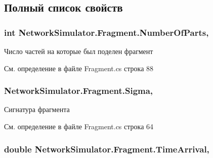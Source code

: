 \subsection{Полный список свойств}
\subsubsection[{\texorpdfstring{Number\+Of\+Parts}{NumberOfParts}}]{\setlength{\rightskip}{0pt plus 5cm}int Network\+Simulator.\+Fragment.\+Number\+Of\+Parts\hspace{0.3cm}{\ttfamily [get]}, {\ttfamily [set]}}\hypertarget{class_network_simulator_1_1_fragment_a2c78012857282ae0729edba332f936ee}{}\label{class_network_simulator_1_1_fragment_a2c78012857282ae0729edba332f936ee}


Число частей на которые был поделен фрагмент 



См. определение в файле Fragment.\+cs строка 88

\subsubsection[{\texorpdfstring{Sigma}{Sigma}}]{ Network\+Simulator.\+Fragment.\+Sigma\hspace{0.3cm}{\ttfamily [get]}, {\ttfamily [set]}}\hypertarget{class_network_simulator_1_1_fragment_a4a04d76e80868fe6ea72fc453d946218}{}\label{class_network_simulator_1_1_fragment_a4a04d76e80868fe6ea72fc453d946218}


Сигнатура фрагмента 



См. определение в файле Fragment.\+cs строка 64

\subsubsection[{\texorpdfstring{Time\+Arrival}{TimeArrival}}]{\setlength{\rightskip}{0pt plus 5cm}double Network\+Simulator.\+Fragment.\+Time\+Arrival\hspace{0.3cm}{\ttfamily [get]}, {\ttfamily [set]}}\hypertarget{class_network_simulator_1_1_fragment_a55a8a96eed9ca0a8bcdad41ac0710e95}{}\label{class_network_simulator_1_1_fragment_a55a8a96eed9ca0a8bcdad41ac0710e95}



